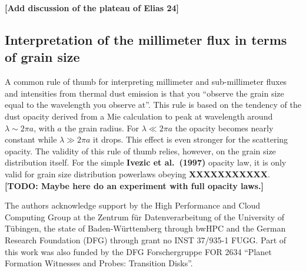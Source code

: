 \documentclass{aa}
\begin{document}
{\bf [Add discussion of the plateau of Elias 24]}

\subsection{Interpretation of the millimeter flux in terms of grain size}
A common rule of thumb for interpreting millimeter and sub-millimeter
fluxes and intensities from thermal dust emission is that you ``observe
the grain size equal to the wavelength you observe at''. This rule is
based on the tendency of the dust opacity derived from a Mie calculation
to peak at wavelength around $\lambda\sim 2\pi a$, with $a$ the grain
radius. For $\lambda \ll 2\pi a$ the opacity becomes nearly constant
while $\lambda \gg 2\pi a$ it drops. This effect is even stronger for
the scattering opacity. The validity of this rule of thumb relies,
however, on the grain size distribution itself. For the simple
{\bf Ivezic et al.~(1997)} opacity law, it is only valid for
grain size distribution powerlaws obeying {\bf XXXXXXXXXXX}.
{\bf [TODO: Maybe here do an experiment with full opacity laws.]}




\begin{acknowledgements}
  The authors acknowledge support by the High Performance and Cloud Computing
  Group at the Zentrum f\"ur Datenverarbeitung of the University of T\"ubingen,
  the state of Baden-W\"urttemberg through bwHPC and the German Research
  Foundation (DFG) through grant no INST 37/935-1 FUGG. Part of this work was
  also funded by the DFG Forschergruppe FOR 2634 ``Planet Formation Witnesses
  and Probes: Transition Disks''.
\end{acknowledgements}


\begingroup


\endgroup

\appendix
\end{document}

